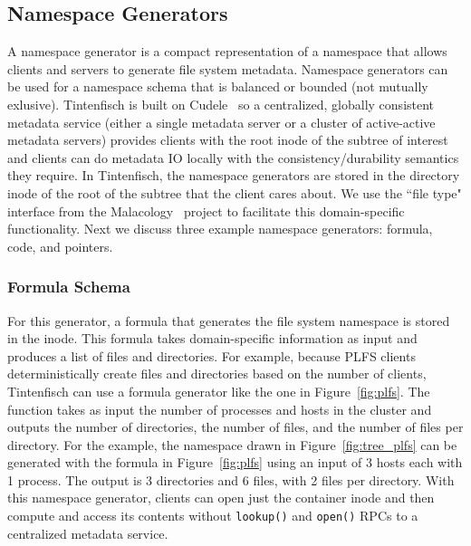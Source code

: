 \subsection{Namespace Generators}
\label{sec:namespace-generators}

A namespace generator is a compact representation of a namespace that allows
clients and servers to generate file system metadata.  Namespace generators can
be used for a namespace schema that is balanced or bounded (not mutually
exlusive).  Tintenfisch is built on Cudele~\cite{sevilla:ipdps18-cudele} so a
centralized, globally consistent metadata service (either a single metadata
server or a cluster of active-active metadata servers) provides clients with
the root inode of the subtree of interest and clients can do metadata IO
locally with the consistency/durability semantics they require. In Tintenfisch,
the namespace generators are stored in the directory inode of the root of the
subtree that the client cares about. We use the ``file type" interface from the
Malacology~\cite{sevilla:eurosys17-malacology} project to facilitate this
domain-specific functionality.  Next we discuss three example namespace
generators: formula, code, and pointers.


\subsubsection{Formula Schema} 

For this generator, a formula that generates the file system namespace is stored
in the inode. This formula takes domain-specific information as input and
produces a list of files and directories.  For example, because PLFS clients
deterministically create files and directories based on the number of clients,
Tintenfisch can use a formula generator like the one in Figure~\ref{fig:plfs}. The
function takes as input the number of processes and hosts in the cluster and
outputs the number of directories, the number of files, and the number of files
per directory.  For the example, the namespace drawn in
Figure~\ref{fig:tree_plfs} can be generated with the formula in
Figure~\ref{fig:plfs} using an input of 3 hosts each with 1 process. The output
is 3 directories and 6 files, with 2 files per directory.  With this namespace
generator, clients can open just the container inode and then compute and access
its contents without \texttt{lookup()} and \texttt{open()} RPCs to a
centralized metadata service.

